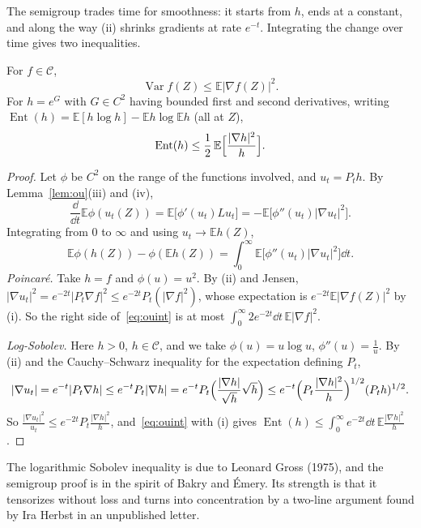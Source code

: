 The semigroup trades time for smoothness: it starts from $h$, ends at a constant, and along the way (ii) shrinks gradients at rate $e^{-t}$. Integrating the change
over time gives two inequalities.

\begin{theorem}\label{thm:gausslsi}
For $f\in\mathcal C$,
\[
\operatorname{Var}f(Z)\le\mathbb E|\nabla f(Z)|^2.
\]
For $h=e^G$ with $G\in C^2$ having bounded first and second derivatives, writing $\operatorname{Ent}(h)=\mathbb E[h\log h]-\mathbb Eh\log\mathbb Eh$ (all at $Z$),
\[
\operatorname{Ent}(h)\le\frac12\,\mathbb E\Bigl[\frac{|\nabla h|^2}h\Bigr].
\]
\end{theorem}
\begin{proof}
Let $\phi$ be $C^2$ on the range of the functions involved, and $u_t=P_th$. By Lemma~\ref{lem:ou}(iii) and (iv),
\[
\frac{\dd}{\dd t}\mathbb E\phi(u_t(Z))=\mathbb E\bigl[\phi'(u_t)Lu_t\bigr]=-\mathbb E\bigl[\phi''(u_t)|\nabla u_t|^2\bigr].
\]
Integrating from $0$ to $\infty$ and using $u_t\to\mathbb Eh(Z)$,
\begin{equation}\label{eq:ouint}
\mathbb E\phi(h(Z))-\phi(\mathbb Eh(Z))=\int_0^\infty\mathbb E\bigl[\phi''(u_t)|\nabla u_t|^2\bigr]\dd t.
\end{equation}
\emph{Poincar\'e.} Take $h=f$ and $\phi(u)=u^2$. By (ii) and Jensen, $|\nabla u_t|^2=e^{-2t}|P_t\nabla f|^2\le e^{-2t}P_t(|\nabla f|^2)$, whose expectation is $e^{-2t}\mathbb E|\nabla f(Z)|^2$
by (i). So the right side of~\eqref{eq:ouint} is at most $\int_0^\infty2e^{-2t}\dd t\,\mathbb E|\nabla f|^2$.

\emph{Log-Sobolev.} Here $h>0$, $h\in\mathcal C$, and we take $\phi(u)=u\log u$, $\phi''(u)=\frac1u$. By (ii) and the Cauchy--Schwarz inequality for the expectation defining $P_t$,
\[
|\nabla u_t|=e^{-t}|P_t\nabla h|\le e^{-t}P_t|\nabla h|=e^{-t}P_t\Bigl(\frac{|\nabla h|}{\sqrt h}\sqrt h\Bigr)\le e^{-t}\Bigl(P_t\frac{|\nabla h|^2}h\Bigr)^{1/2}(P_th)^{1/2}.
\]
So $\frac{|\nabla u_t|^2}{u_t}\le e^{-2t}P_t\frac{|\nabla h|^2}h$, and~\eqref{eq:ouint} with (i) gives $\operatorname{Ent}(h)\le\int_0^\infty e^{-2t}\dd t\,\mathbb E\frac{|\nabla h|^2}h$.
\end{proof}

The logarithmic Sobolev inequality is due to Leonard Gross (1975), and the semigroup proof is in the spirit of Bakry and \'Emery. Its strength is that it
tensorizes without loss and turns into concentration by a two-line argument found by Ira Herbst in an unpublished letter.

